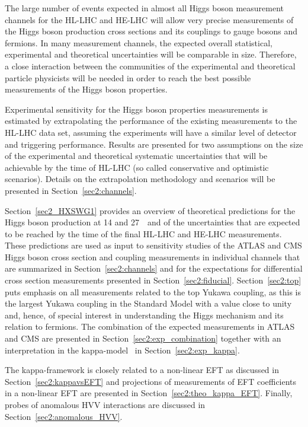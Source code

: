 

The large number of events expected in almost all Higgs boson measurement channels for the HL-LHC and HE-LHC will allow very precise measurements of the Higgs boson production cross sections and its couplings to gauge bosons and fermions. In many measurement channels, the expected overall statistical, experimental and theoretical uncertainties will be comparable in size. Therefore, a close interaction between the communities of the experimental and theoretical particle physicists will be needed in order to reach the best possible measurements of the Higgs boson properties.

Experimental sensitivity for the Higgs boson properties measurements is estimated by extrapolating the performance of the existing measurements to the HL-LHC data set, assuming the experiments will have a similar level of detector and triggering performance. Results are presented for two assumptions on the size of the experimental and theoretical systematic uncertainties that will be achievable by the time of HL-LHC (so called conservative and optimistic scenarios). Details on the extrapolation methodology and scenarios will be presented in Section~\ref{sec2:channels}.

Section~\ref{sec2_HXSWG1} provides an overview of theoretical predictions for the Higgs boson production at 14 and 27~\UTeV\ and of the uncertainties that are expected to be reached by the time of the final HL-LHC and HE-LHC measurements. 
These predictions are used as input to sensitivity studies of the ATLAS and CMS Higgs boson cross section and coupling measurements in individual channels that are summarized in Section~\ref{sec2:channels} and for the expectations for differential cross section measurements presented in Section~\ref{sec2:fiducial}.
Section~\ref{sec2:top} puts emphasis on all measurements related to the top Yukawa coupling, as this is the largest Yukawa coupling in the Standard Model with a value close to unity and, hence, of special interest in understanding the Higgs mechanism and its relation to fermions.
The combination of the expected measurements in ATLAS and CMS are presented in Section~\ref{sec2:exp_combination} together with an interpretation in the kappa-model~\cite{LHCHiggsCrossSectionWorkingGroup:2012nn,Heinemeyer:2013tqa} in Section~\ref{sec2:exp_kappa}.

The kappa-framework is closely related to a non-linear EFT as discussed in Section~\ref{sec2:kappavsEFT} and projections of measurements of EFT coefficients in a non-linear EFT are presented in Section~\ref{sec2:theo_kappa_EFT}. 
Finally, probes of anomalous HVV interactions are discussed in Section~\ref{sec2:anomalous_HVV}.

